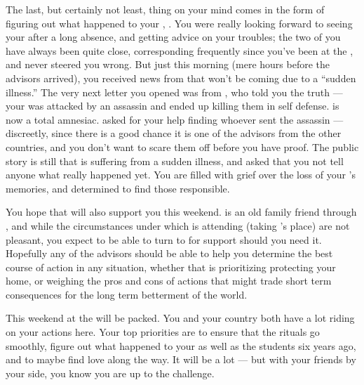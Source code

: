 \documentclass[char]{GL2020}
\begin{document}
The last, but certainly not least, thing on your mind comes in the form of figuring out what happened to your \cHeadDiplomat{\auncle}, \cHeadDiplomat{}. You were really looking forward to seeing your \cHeadDiplomat{\auncle} after a long absence, and getting \cHeadDiplomat{\their} advice on your troubles; the two of you have always been quite close, corresponding frequently since you’ve been at the \pSc{}, and \cHeadDiplomat{\they} never steered you wrong. But just this morning (mere hours before the advisors arrived), you received news from \cEbbPriest{\full} that \cHeadDiplomat{} won't be coming due to a ``sudden illness.'' The very next letter you opened was from \cJuniorStatesman{}, who told you the truth — your \cHeadDiplomat{\auncle} was attacked by an assassin and ended up killing them in self defense. \cHeadDiplomat{} is now a total amnesiac. \cJuniorStatesman{} asked for your help finding whoever sent the assassin — discreetly, since there is a good chance it is one of the advisors from the other countries, and you don't want to scare them off before you have proof. The public story is still that \cHeadDiplomat{} is suffering from a sudden illness, and \cJuniorStatesman{} asked that you not tell anyone what really happened yet. You are filled with grief over the loss of your \cHeadDiplomat{\auncle}'s memories, and determined to find those responsible. 

You hope that \cEbbPriest{} will also support you this weekend. \cEbbPriest{} is an old family friend through \cHeadDiplomat{}, and while the circumstances under which \cEbbPriest{} is attending (taking \cHeadDiplomat{}’s place) are not pleasant, you expect to be able to turn to \cEbbPriest{\them} for support should you need it. Hopefully any of the advisors should be able to help you determine the best course of action in any situation, whether that is prioritizing protecting your home, or weighing the pros and cons of actions that might trade short term consequences for the long term betterment of the world.

This weekend at the \pSchool{} will be packed. You and your country both have a lot riding on your actions here. Your top priorities are to ensure that the rituals go smoothly, figure out what happened to your \cHeadDiplomat{\Auncle} \cHeadDiplomat{} as well as the students six years ago, and to maybe find love along the way. It will be a lot — but with your friends by your side, you know you are up to the challenge.
\end{document}
